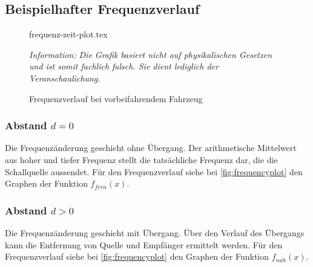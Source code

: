 \documentclass[12pt, a4paper]{article}
\begin{document}
\FloatBarrier
\subsection{Beispielhafter Frequenzverlauf}

\begin{figure}
    \centering
    {frequenz-zeit-plot.tex}
    \caption{Frequenzverlauf bei vorbeifahrendem Fahrzeug}
    \label{fig:frequencyplot}
    \vspace{5mm}
    \begin{minipage}{11cm}
        \begin{footnotesize}
            \emph{
                Information: Die Grafik basiert nicht auf physikalischen
                Gesetzen und ist somit fachlich falsch. Sie dient lediglich
                der Veranschaulichung.
            }
        \end{footnotesize}
    \end{minipage}
\end{figure}

\vspace{1cm}

\subsubsection*{Abstand \(d = 0\)}
Die Frequenzänderung geschieht ohne Übergang. Der arithmetische Mittelwert aus
hoher und tiefer Frequenz stellt die tatsächliche Frequenz dar, die die
Schallquelle aussendet. Für den Frequenzverlauf siehe bei
\autoref{fig:frequencyplot} den Graphen der Funktion \(f_{fern}(x)\).

\subsubsection*{Abstand \(d > 0\)}
Die Frequenzänderung geschieht mit Übergang. Über den Verlauf des Übergangs kann
die Entfernung von Quelle und Empfänger ermittelt werden. Für den Frequenzverlauf
siehe bei \autoref{fig:frequencyplot} den Graphen der Funktion \(f_{nah}(x)\).
\end{document}
